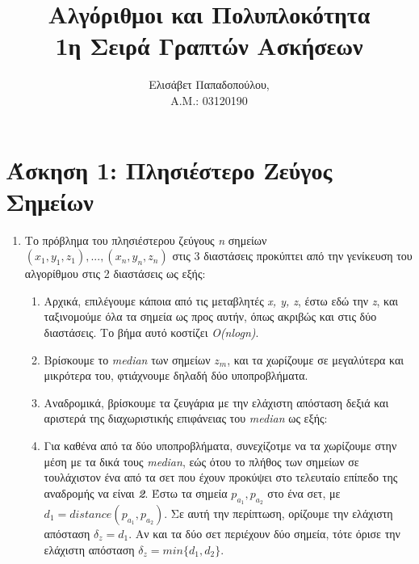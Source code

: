 \documentclass{article}
\begin{document}
\title{\section*{\centering Αλγόριθμοι και Πολυπλοκότητα\\[1ex] 1η Σειρά Γραπτών Ασκήσεων}}
\date{}
\author{Ελισάβετ Παπαδοπούλου, \\ Α.Μ.: 03120190}
\maketitle

\section*{\large Άσκηση 1: Πλησιέστερο Ζεύγος Σημείων}
\begin{enumerate}[label=(\alph*)]
	\item Το πρόβλημα του πλησιέστερου ζεύγους \emph{\textlatin{n}} σημείων \emph{$(x_{1}, y_{1}, z_{1}), ..., (x_{n}, y_{n}, z_{n})$ } στις 3 διαστάσεις προκύπτει από την γενίκευση του αλγορίθμου στις 2 διαστάσεις ως εξής: 
\begin{enumerate}[label=(\roman*)]
	\item Αρχικά, επιλέγουμε κάποια από τις μεταβλητές \emph{\textlatin{x, y, z}}, έστω εδώ την \emph{\textlatin{z}}, και ταξινομούμε όλα τα σημεία ως προς αυτήν, όπως ακριβώς και στις δύο διαστάσεις. Το βήμα αυτό κοστίζει \emph{\textlatin{O(nlogn)}}.
	\item Βρίσκουμε το  \emph{\textlatin{median}} των σημείων \emph{\textlatin{${z_m}$}}, και τα χωρίζουμε σε μεγαλύτερα και μικρότερα του, φτιάχνουμε δηλαδή δύο υποπροβλήματα.
	\item Αναδρομικά, βρίσκουμε τα ζευγάρια με την ελάχιστη απόσταση δεξιά και αριστερά της διαχωριστικής επιφάνειας του \emph{\textlatin{median}} ως εξής: 
	\item Για καθένα από τα δύο υποπροβλήματα, συνεχίζοτμε να τα χωρίζουμε στην μέση με τα δικά τους \emph{\textlatin{median}}, εώς ότου το πλήθος των σημείων σε τουλάχιστον ένα από τα σετ που έχουν προκύψει στο τελευταίο επίπεδο της αναδρομής να είναι \emph{\textbf{2}}. Έστω τα σημεία \emph{\textlatin{${p_{a_1}, p_{a_2}}$}} στο ένα σετ, με \emph{\textlatin{${d_1 = distance(p_{a_1}, p_{a_2})}$}}. Σε αυτή την περίπτωση, ορίζουμε την ελάχιστη απόσταση \emph{\textlatin{${\delta_z = d_1}$}}. Αν και τα δύο σετ περιέχουν δύο σημεία, τότε όρισε την ελάχιστη απόσταση \emph{\textlatin{${\delta_z = min\{d_1, d_2\}}$}}.   

\end{enumerate}
\end{enumerate}
\end{document}
